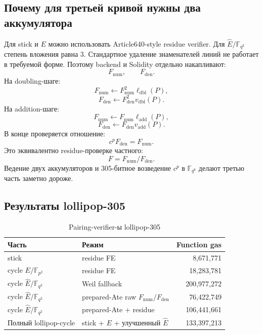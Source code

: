 \documentclass[12pt,a4paper]{article}
\begin{document}
\subsection{Почему для третьей кривой нужны два аккумулятора}

Для stick и $E$ можно использовать Article640-style residue verifier. Для
$\widehat{E}/\mathbb{F}_{q^2}$ степень вложения равна $3$. Стандартное удаление
знаменателей линий не работает в требуемой форме. Поэтому backend и Solidity
отдельно накапливают:
\[
    F_{\mathrm{num}},\qquad F_{\mathrm{den}}.
\]
На doubling-шаге:
\[
    F_{\mathrm{num}}\leftarrow
    F_{\mathrm{num}}^2\ell_{\mathrm{dbl}}(P),
\]
\[
    F_{\mathrm{den}}\leftarrow
    F_{\mathrm{den}}^2v_{\mathrm{dbl}}(P).
\]
На addition-шаге:
\[
    F_{\mathrm{num}}\leftarrow
    F_{\mathrm{num}}\ell_{\mathrm{add}}(P),
\]
\[
    F_{\mathrm{den}}\leftarrow
    F_{\mathrm{den}}v_{\mathrm{add}}(P).
\]
В конце проверяется отношение:
\[
    c^p F_{\mathrm{den}}=F_{\mathrm{num}}.
\]
Это эквивалентно residue-проверке частного:
\[
    F=F_{\mathrm{num}}/F_{\mathrm{den}}.
\]
Ведение двух аккумуляторов и 305-битное возведение $c^p$ в
$\mathbb{F}_{q^6}$ делают третью часть заметно дороже.

\subsection{Результаты lollipop-305}

\begin{table}[htbp]
\centering
\caption{Pairing-verifier-ы lollipop-305}
\small
\begin{tabularx}{\linewidth}{Y Y r}
\toprule
Часть & Режим & Function gas \\
\midrule
stick & residue FE & 8,671,771 \\
cycle $E/\mathbb{F}_{p^2}$ & residue FE & 18,283,781 \\
cycle $\widehat{E}/\mathbb{F}_{q^2}$ & Weil fallback & 200,977,272 \\
cycle $\widehat{E}/\mathbb{F}_{q^2}$ & prepared-Ate raw $F_{\mathrm{num}}/F_{\mathrm{den}}$ & 76,422,749 \\
cycle $\widehat{E}/\mathbb{F}_{q^2}$ & prepared-Ate + residue & 106,441,661 \\
\midrule
Полный lollipop-cycle & stick + $E$ + улучшенный $\widehat{E}$ & 133,397,213 \\
\bottomrule
\end{tabularx}
\end{table}
\end{document}
